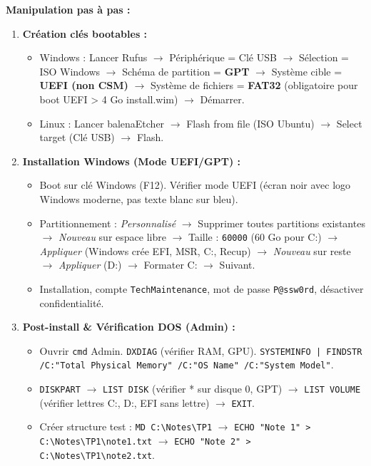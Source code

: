 \documentclass[11pt]{article}
\begin{document}
\begin{experience}
\textbf{Manipulation pas à pas :}
\begin{enumerate}
  \item \textbf{Création clés bootables :}
        \begin{itemize}
          \item Windows : Lancer Rufus $\rightarrow$ Périphérique = Clé USB $\rightarrow$ Sélection = ISO Windows $\rightarrow$ Schéma de partition = \textbf{GPT} $\rightarrow$ Système cible = \textbf{UEFI (non CSM)} $\rightarrow$ Système de fichiers = \textbf{FAT32} (obligatoire pour boot UEFI > 4 Go install.wim) $\rightarrow$ Démarrer.
          \item Linux : Lancer balenaEtcher $\rightarrow$ Flash from file (ISO Ubuntu) $\rightarrow$ Select target (Clé USB) $\rightarrow$ Flash.
        \end{itemize}
  \item \textbf{Installation Windows (Mode UEFI/GPT) :}
        \begin{itemize}
          \item Boot sur clé Windows (F12). Vérifier mode UEFI (écran noir avec logo Windows moderne, pas texte blanc sur bleu).
          \item Partitionnement : \emph{Personnalisé} $\rightarrow$ Supprimer toutes partitions existantes $\rightarrow$ \emph{Nouveau} sur espace libre $\rightarrow$ Taille : \texttt{60000} (60 Go pour C:) $\rightarrow$ \emph{Appliquer} (Windows crée EFI, MSR, C:, Recup) $\rightarrow$ \emph{Nouveau} sur reste $\rightarrow$ \emph{Appliquer} (D:) $\rightarrow$ Formater C: $\rightarrow$ Suivant.
          \item Installation, compte \texttt{TechMaintenance}, mot de passe \texttt{P@ssw0rd}, désactiver confidentialité.
        \end{itemize}
  \item \textbf{Post-install \& Vérification DOS (Admin) :}
        \begin{itemize}
          \item Ouvrir \texttt{cmd} Admin. \texttt{DXDIAG} (vérifier RAM, GPU). \texttt{SYSTEMINFO | FINDSTR /C:"Total Physical Memory" /C:"OS Name" /C:"System Model"}.
          \item \texttt{DISKPART} $\rightarrow$ \texttt{LIST DISK} (vérifier * sur disque 0, GPT) $\rightarrow$ \texttt{LIST VOLUME} (vérifier lettres C:, D:, EFI sans lettre) $\rightarrow$ \texttt{EXIT}.
          \item Créer structure test : \texttt{MD C:\textbackslash Notes\textbackslash TP1} $\rightarrow$ \texttt{ECHO "Note 1" > C:\textbackslash Notes\textbackslash TP1\textbackslash note1.txt} $\rightarrow$ \texttt{ECHO "Note 2" > C:\textbackslash Notes\textbackslash TP1\textbackslash note2.txt}.

\end{itemize}
\end{enumerate}
\end{experience}
\end{document}
